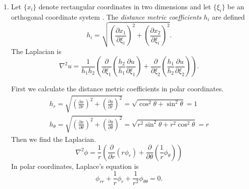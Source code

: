 {\begin{Solution}
\begin{enumerate}
    We calculate the value
    of the derivative using the polar differentiation formulas.
    \begin{gather*}
      \frac{\dd}{\dd z} \Log z 
      = \e^{-\imath \theta} \frac{\partial}{\partial r} (\ln r + \imath \theta)
      = \e^{- \imath \theta} \frac{1}{r}
      = \frac{1}{z}
      \\
      \frac{\dd}{\dd z} \Log z 
      = \frac{- \imath}{z} \frac{\partial}{\partial \theta} (\ln r + \imath \theta)
      = \frac{- \imath}{z} \imath
      = \frac{1}{z}
    \end{gather*}
  \item 
    Let $\{ x_i \}$ denote rectangular coordinates in two dimensions and let 
    $\{ \xi_i \}$ be an orthogonal coordinate system .  The 
    \textit{distance metric coefficients}
    $h_i$ are defined
    \[
    h_i = \sqrt{ \left( \frac{\partial x_1}{\partial \xi_i} \right)^2 
      + \left( \frac{\partial x_2}{\partial \xi_i} \right)^2 }.
    \]
    The Laplacian is
    \[
    \nabla^2 u = \frac{1}{h_1 h_2} \left(
      \frac{\partial}{\partial \xi_1} \left( \frac{h_2}{h_1} \frac{\partial u}{\partial \xi_1} \right)
      + \frac{\partial}{\partial \xi_2} \left( \frac{h_1}{h_2} \frac{\partial u}{\partial \xi_2} \right)
    \right).
    \]

    First we calculate the distance metric coefficients in polar coordinates.
    \begin{gather*}
      h_r = \sqrt{ \left( \frac{\partial x}{\partial r} \right)^2 
        + \left( \frac{\partial y}{\partial r} \right)^2 } = \sqrt{ \cos^2 \theta + \sin^2 \theta } = 1
      \\
      h_\theta = \sqrt{ \left( \frac{\partial x}{\partial \theta} \right)^2 
        + \left( \frac{\partial y}{\partial \theta} \right)^2 } = \sqrt{ r^2 \sin^2 \theta + r^2 \cos^2 \theta } = r
    \end{gather*}
    Then we find the Laplacian.
    \[
    \nabla^2 \phi = \frac{1}{r} \left( \frac{\partial}{\partial r} (r \phi_r)
      + \frac{\partial}{\partial \theta} \left( \frac{1}{r} \phi_\theta \right) \right)
    \]
    In polar coordinates, Laplace's equation is
    \[
    \phi_{r r} + \frac{1}{r} \phi_r + \frac{1}{r^2} \phi_{\theta \theta} = 0.
    \]
  \end{enumerate}
\end{Solution}










}
